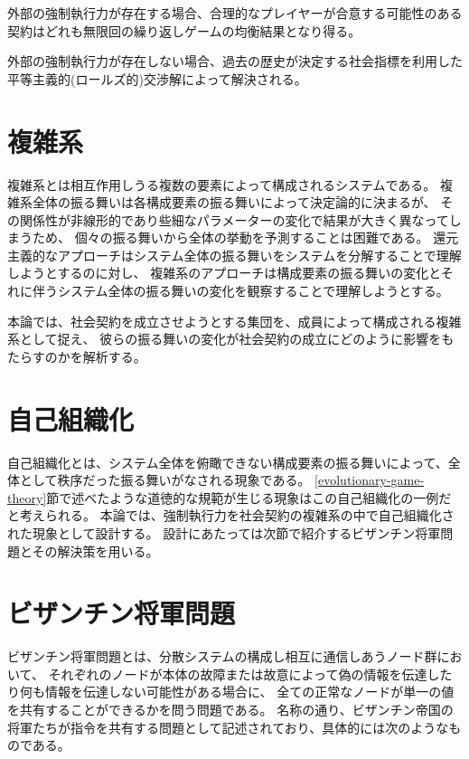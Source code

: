 \begin{description}
  \item 外部の強制執行力が存在する場合、合理的なプレイヤーが合意する可能性のある契約はどれも無限回の繰り返しゲームの均衡結果となり得る。
  \item 外部の強制執行力が存在しない場合、過去の歴史が決定する社会指標を利用した平等主義的(ロールズ的)交渉解によって解決される。 
\end{description}

\section{複雑系}
複雑系とは相互作用しうる複数の要素によって構成されるシステムである。
複雑系全体の振る舞いは各構成要素の振る舞いによって決定論的に決まるが、
その関係性が非線形的であり些細なパラメーターの変化で結果が大きく異なってしまうため、
個々の振る舞いから全体の挙動を予測することは困難である。
還元主義的なアプローチはシステム全体の振る舞いをシステムを分解することで理解しようとするのに対し、
複雑系のアプローチは構成要素の振る舞いの変化とそれに伴うシステム全体の振る舞いの変化を観察することで理解しようとする。

本論では、社会契約を成立させようとする集団を、成員によって構成される複雑系として捉え、
彼らの振る舞いの変化が社会契約の成立にどのように影響をもたらすのかを解析する。

\section{自己組織化}
自己組織化とは、システム全体を俯瞰できない構成要素の振る舞いによって、全体として秩序だった振る舞いがなされる現象である。
\ref{evolutionary-game-theory}節で述べたような道徳的な規範が生じる現象はこの自己組織化の一例だと考えられる。
本論では、強制執行力を社会契約の複雑系の中で自己組織化された現象として設計する。
設計にあたっては次節で紹介するビザンチン将軍問題とその解決策を用いる。

\section{ビザンチン将軍問題}
ビザンチン将軍問題とは、分散システムの構成し相互に通信しあうノード群において、
それぞれのノードが本体の故障または故意によって偽の情報を伝達したり何も情報を伝達しない可能性がある場合に、
全ての正常なノードが単一の値を共有することができるかを問う問題である。\cite{lamport1982}
名称の通り、ビザンチン帝国の将軍たちが指令を共有する問題として記述されており、具体的には次のようなものである。

